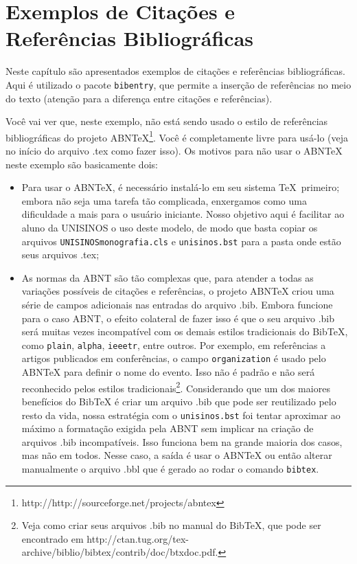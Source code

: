 \section{Exemplos de Citações e Referências Bibliográficas}
\nobibliography* %
Neste capítulo são apresentados exemplos de citações e referências bibliográficas.  Aqui é utilizado o pacote \texttt{bibentry}, que permite a inserção de referências no meio do texto (atenção para a diferença entre citações e referências).

Você vai ver que, neste exemplo, não está sendo usado o estilo de referências bibliográficas do projeto ABNTeX\footnote{http://http://sourceforge.net/projects/abntex}.  Você é completamente livre para usá-lo (veja no início do arquivo .tex como fazer isso).  Os motivos para não usar o ABNTeX neste exemplo são basicamente dois:
\begin{itemize}
	\item Para usar o ABNTeX, é necessário instalá-lo em seu sistema \TeX\ primeiro; embora não seja uma tarefa tão complicada, enxergamos como uma dificuldade a mais para o usuário iniciante.  Nosso objetivo aqui é facilitar ao aluno da UNISINOS o uso deste modelo, de modo que basta copiar os arquivos \texttt{UNISINOSmonografia.cls} e \texttt{unisinos.bst} para a pasta onde estão seus arquivos .tex;
	\item As normas da ABNT são tão complexas que, para atender a todas as variações possíveis de citações e referências, o projeto ABNTeX criou uma série de campos adicionais nas entradas do arquivo .bib.  Embora funcione para o caso ABNT, o efeito colateral de fazer isso é que o seu arquivo .bib será muitas vezes incompatível com os demais estilos tradicionais do BibTeX, como \texttt{plain}, \texttt{alpha}, \texttt{ieeetr}, entre outros.  Por exemplo, em referências a artigos publicados em conferências, o campo \texttt{organization} é usado pelo ABNTeX para definir o nome do evento.  Isso não é padrão e não será reconhecido pelos estilos tradicionais\footnote{Veja como criar seus arquivos .bib no manual do BibTeX, que pode ser encontrado em http://ctan.tug.org/tex-archive/biblio/bibtex/contrib/doc/btxdoc.pdf.}.  Considerando que um dos maiores benefícios do BibTeX é criar um arquivo .bib que pode ser reutilizado pelo resto da vida, nossa estratégia com o \texttt{unisinos.bst} foi tentar aproximar ao máximo a formatação exigida pela ABNT sem implicar na criação de arquivos .bib incompatíveis.  Isso funciona bem na grande maioria dos casos, mas não em todos.  Nesse caso, a saída é usar o ABNTeX ou então alterar manualmente o arquivo .bbl que é gerado ao rodar o comando \texttt{bibtex}.
\end{itemize}

